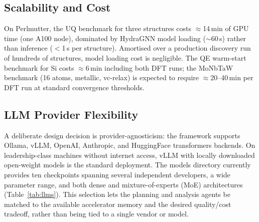 \documentclass[conference]{IEEEtran}
\def\acs#1{#1}%
\begin{document}
\subsection{Scalability and Cost}
On Perlmutter, the \acs{UQ} benchmark for three structures costs $\approx$14\,min
of \acs{GPU} time (one A100 node), dominated by HydraGNN model loading ($\sim$60\,s)
rather than inference ($<$1\,s per structure). Amortised over a production
discovery run of hundreds of structures, model loading cost is negligible.
The \acs{QE} warm-start benchmark for Si costs $\approx$6\,min including both \acs{DFT}
runs; the MoNbTaW benchmark (16 atoms, metallic, vc-relax) is expected to
require $\approx$20--40\,min per \acs{DFT} run at standard convergence thresholds.

\subsection{LLM Provider Flexibility}
A deliberate design decision is provider-agnosticism: the framework supports
Ollama, vLLM, OpenAI, Anthropic, and HuggingFace transformers backends.
On leadership-class machines without internet access, vLLM with locally
downloaded open-weight models is the standard deployment. The models directory
currently provides ten checkpoints spanning several independent developers, a
wide parameter range, and both dense and mixture-of-experts (MoE) architectures
(Table~\ref{tab:llms}). This selection lets the planning and analysis agents be
matched to the available accelerator memory and the desired quality/cost
tradeoff, rather than being tied to a single vendor or model.
\end{document}
